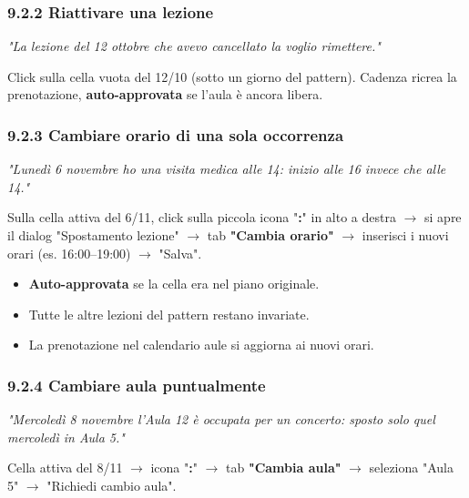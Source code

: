 \documentclass[11pt,a4paper]{article}
\renewenvironment{quote}
  {\begin{list}{}{%
      \setlength{\leftmargin}{8pt}%
      \setlength{\rightmargin}{8pt}%
      \setlength{\topsep}{6pt}%
      \setlength{\parsep}{0pt}}%
      \item\relax\color{black!75}\itshape}
  {\end{list}}
\begin{document}
\subsubsection{9.2.2 Riattivare una lezione}


\begin{quote}
\textit{"La lezione del 12 ottobre che avevo cancellato la voglio rimettere."}
\end{quote}

Click sulla cella vuota del 12/10 (sotto un giorno del pattern). Cadenza ricrea la prenotazione, \textbf{auto-approvata} se l'aula è ancora libera.

\subsubsection{9.2.3 Cambiare orario di una sola occorrenza}


\begin{quote}
\textit{"Lunedì 6 novembre ho una visita medica alle 14: inizio alle 16 invece che alle 14."}
\end{quote}

Sulla cella attiva del 6/11, click sulla piccola icona "\textbf{\textbf{:}}" in alto a destra $\rightarrow$ si apre il dialog "Spostamento lezione" $\rightarrow$ tab \textbf{"Cambia orario"} $\rightarrow$ inserisci i nuovi orari (es. 16:00--19:00) $\rightarrow$ "Salva".

\begin{itemize}
  \item \textbf{Auto-approvata} se la cella era nel piano originale.
  \item Tutte le altre lezioni del pattern restano invariate.
  \item La prenotazione nel calendario aule si aggiorna ai nuovi orari.
\end{itemize}

\subsubsection{9.2.4 Cambiare aula puntualmente}


\begin{quote}
\textit{"Mercoledì 8 novembre l'Aula 12 è occupata per un concerto: sposto solo quel mercoledì in Aula 5."}
\end{quote}

Cella attiva del 8/11 $\rightarrow$ icona "\textbf{\textbf{:}}" $\rightarrow$ tab \textbf{"Cambia aula"} $\rightarrow$ seleziona "Aula 5" $\rightarrow$ "Richiedi cambio aula".
\end{document}
